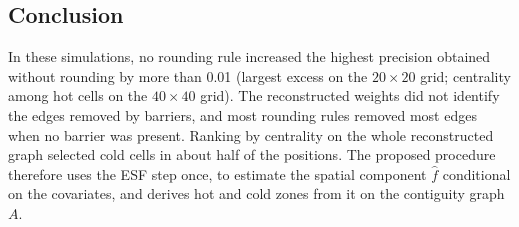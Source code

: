 \subsection{Conclusion}
\label{app:rec-conclusion}

In these simulations, no rounding rule increased the highest precision obtained without rounding by more than 0.01 (largest excess on the $20\times20$ grid; centrality among hot cells on the $40\times40$ grid). The reconstructed weights did not identify the edges removed by barriers, and most rounding rules removed most edges when no barrier was present. Ranking by centrality on the whole reconstructed graph selected cold cells in about half of the positions. The proposed procedure therefore uses the ESF step once, to estimate the spatial component $\hat f$ conditional on the covariates, and derives hot and cold zones from it on the contiguity graph $A$.
